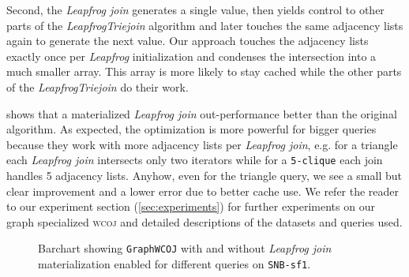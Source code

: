 Second, the \textit{Leapfrog join} generates a single value, then yields control to other parts
of the \textit{LeapfrogTriejoin} algorithm and later touches the same adjacency lists again to generate the next value.
Our approach touches the adjacency lists exactly once per \textit{Leapfrog} initialization and
condenses the intersection into a much smaller array.
This array is more likely to stay cached while the other parts of the \textit{LeapfrogTriejoin} do their work.

 shows that a materialized \textit{Leapfrog join} out-performance better than
the original algorithm.
As expected, the optimization is more powerful for bigger queries because they work with more
adjacency lists per \textit{Leapfrog join}, e.g. for a triangle each \textit{Leapfrog join} intersects
only two iterators while for a \texttt{5-clique} each join handles 5 adjacency lists.
Anyhow, even for the triangle query, we see a small but clear improvement and a lower error due to
better cache use.
We refer the reader to our experiment section (\ref{sec:experiments}) for further experiments on
our graph specialized \textsc{wcoj} and detailed descriptions of the datasets and queries used.

\begin{figure}[H]
\centering

\caption{Barchart showing \texttt{GraphWCOJ} with and without \textit{Leapfrog join} materialization
enabled for different queries on \texttt{SNB-sf1}.}
\label{fig:mat-vs-nomat}
\end{figure}